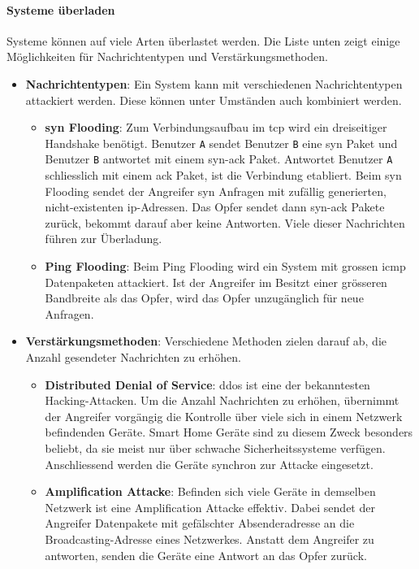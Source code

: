 \documentclass[11pt, a4paper]{article}
\begin{document}
\paragraph{Systeme überladen}
Systeme können auf viele Arten überlastet werden. Die Liste unten zeigt einige Möglichkeiten für Nachrichtentypen und Verstärkungsmethoden. 
\begin{itemize}
	\item \textbf{Nachrichtentypen}: Ein System kann mit verschiedenen Nachrichtentypen attackiert werden. Diese können unter Umständen auch kombiniert werden.
	\begin{itemize}
		\item \textbf{\gls{syn} Flooding}: Zum Verbindungsaufbau im \gls{tcp} wird ein dreiseitiger Handshake benötigt. Benutzer \texttt{A} sendet Benutzer \texttt{B} eine \gls{syn} Paket und Benutzer \texttt{B} antwortet mit einem \gls{syn}-\gls{ack} Paket. Antwortet Benutzer \texttt{A} schliesslich mit einem \gls{ack} Paket, ist die Verbindung etabliert. Beim \gls{syn} Flooding sendet der Angreifer \gls{syn} Anfragen mit zufällig generierten, nicht-existenten \gls{ip}-Adressen. Das Opfer sendet dann \gls{syn}-\gls{ack} Pakete zurück, bekommt darauf aber keine Antworten. Viele dieser Nachrichten führen zur Überladung.
		\item \textbf{Ping Flooding}: Beim Ping Flooding wird ein System mit grossen \gls{icmp} Datenpaketen attackiert. Ist der Angreifer im Besitzt einer grösseren Bandbreite als das Opfer, wird das Opfer unzugänglich für neue Anfragen.
	\end{itemize}
	\item \textbf{Verstärkungsmethoden}: Verschiedene Methoden zielen darauf ab, die Anzahl gesendeter Nachrichten zu erhöhen.
	\begin{itemize}
		\item \textbf{Distributed Denial of Service}: \gls{ddos} ist eine der bekanntesten Hacking-Attacken. Um die Anzahl Nachrichten zu erhöhen, übernimmt der Angreifer vorgängig die Kontrolle über viele sich in einem Netzwerk befindenden Geräte. Smart Home Geräte sind zu diesem Zweck besonders beliebt, da sie meist nur über schwache Sicherheitssysteme verfügen.~\cite{DDoSAtta:online} Anschliessend werden die Geräte synchron zur Attacke eingesetzt.
		\item \textbf{Amplification Attacke}: Befinden sich viele Geräte in demselben Netzwerk ist eine Amplification Attacke effektiv. Dabei sendet der Angreifer Datenpakete mit gefälschter Absenderadresse an die Broadcasting-Adresse eines Netzwerkes. Anstatt dem Angreifer zu antworten, senden die Geräte eine Antwort an das Opfer zurück. 
	\end{itemize}
\end{itemize}
\end{document}
